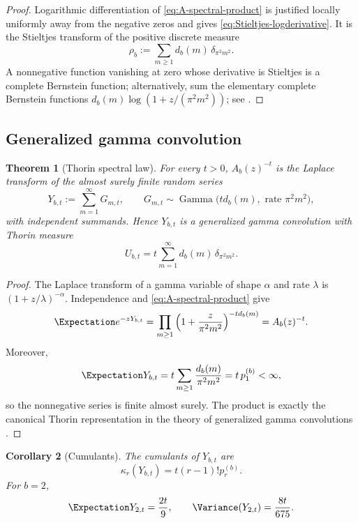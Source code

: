 \documentclass[11pt]{article}
\newtheorem{theorem}{Theorem}[section]
\newtheorem{corollary}[theorem]{Corollary}
\theoremstyle{definition}
\theoremstyle{remark}
\begin{document}
\begin{proof}
Logarithmic differentiation of \eqref{eq:A-spectral-product} is justified locally uniformly away from the negative zeros and gives \eqref{eq:Stieltjes-logderivative}.  It is the Stieltjes transform of the positive discrete measure
\begin{equation}\label{eq:spectral-measure}
  \rho_b:=\sum_{m\ge1}d_b(m)\,\delta_{\pi^2m^2}.
\end{equation}
A nonnegative function vanishing at zero whose derivative is Stieltjes is a complete Bernstein function; alternatively, sum the elementary complete Bernstein functions
\(d_b(m)\log(1+z/(\pi^2m^2))\); see \cite{Schilling2012}.
\end{proof}

\subsection{Generalized gamma convolution}

\begin{theorem}[Thorin spectral law]\label{thm:GGC}
For every \(t>0\), \(A_b(z)^{-t}\) is the Laplace transform of the almost surely finite random series
\begin{equation}\label{eq:Ybt}
  Y_{b,t}:=\sum_{m=1}^{\infty}G_{m,t},
  \qquad
  G_{m,t}\sim\operatorname{Gamma}
  \bigl(td_b(m),\text{ rate }\pi^2m^2\bigr),
\end{equation}
with independent summands.  Hence \(Y_{b,t}\) is a generalized gamma convolution with Thorin measure
\begin{equation}\label{eq:Thorin-measure}
  U_{b,t}=t\sum_{m=1}^{\infty}d_b(m)\,\delta_{\pi^2m^2}.
\end{equation}
\end{theorem}

\begin{proof}
The Laplace transform of a gamma variable of shape \(\alpha\) and rate \(\lambda\) is
\((1+z/\lambda)^{-\alpha}\).  Independence and \eqref{eq:A-spectral-product} give
\[
 \Expectation e^{-zY_{b,t}}
 =\prod_{m\ge1}\left(1+\frac{z}{\pi^2m^2}\right)^{-td_b(m)}
 =A_b(z)^{-t}.
\]
Moreover,
\[
 \Expectation Y_{b,t}=t\sum_{m\ge1}\frac{d_b(m)}{\pi^2m^2}
 =t\,p_1^{(b)}<\infty,
\]
so the nonnegative series is finite almost surely.  The product is exactly the canonical Thorin representation in the theory of generalized gamma convolutions \cite{Bondesson1992,James2008}.
\end{proof}

\begin{corollary}[Cumulants]\label{cor:GGC-cumulants}
The cumulants of \(Y_{b,t}\) are
\begin{equation}\label{eq:GGC-cumulants}
  \kappa_r(Y_{b,t})=t(r-1)!p_r^{(b)}.
\end{equation}
For \(b=2\),
\begin{equation}
  \Expectation Y_{2,t}=\frac{2t}{9},
  \qquad
  \Variance(Y_{2,t})=\frac{8t}{675}.
\end{equation}
\end{corollary}
\end{document}
